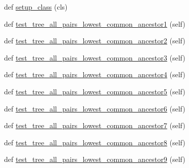 \begin{DoxyCompactItemize}
\item 
def \hyperlink{classnetworkx_1_1algorithms_1_1tests_1_1test__lowest__common__ancestors_1_1TestTreeLCA_a8c1cc9b90906daa971ae41ac3050ba1a}{setup\+\_\+class} (cls)
\item 
def \hyperlink{classnetworkx_1_1algorithms_1_1tests_1_1test__lowest__common__ancestors_1_1TestTreeLCA_aaae1063c63cb13fc127b25596dd39531}{test\+\_\+tree\+\_\+all\+\_\+pairs\+\_\+lowest\+\_\+common\+\_\+ancestor1} (self)
\item 
def \hyperlink{classnetworkx_1_1algorithms_1_1tests_1_1test__lowest__common__ancestors_1_1TestTreeLCA_ae9e7e2a583da4b6af5feb55dbdf56a5f}{test\+\_\+tree\+\_\+all\+\_\+pairs\+\_\+lowest\+\_\+common\+\_\+ancestor2} (self)
\item 
def \hyperlink{classnetworkx_1_1algorithms_1_1tests_1_1test__lowest__common__ancestors_1_1TestTreeLCA_a6f2f7cd74bc87107b18c4e16a1600ea3}{test\+\_\+tree\+\_\+all\+\_\+pairs\+\_\+lowest\+\_\+common\+\_\+ancestor3} (self)
\item 
def \hyperlink{classnetworkx_1_1algorithms_1_1tests_1_1test__lowest__common__ancestors_1_1TestTreeLCA_a3ab237dc6f8edb0c767de25cc72ed414}{test\+\_\+tree\+\_\+all\+\_\+pairs\+\_\+lowest\+\_\+common\+\_\+ancestor4} (self)
\item 
def \hyperlink{classnetworkx_1_1algorithms_1_1tests_1_1test__lowest__common__ancestors_1_1TestTreeLCA_a50175651699cc97c89d43cefbfeacd83}{test\+\_\+tree\+\_\+all\+\_\+pairs\+\_\+lowest\+\_\+common\+\_\+ancestor5} (self)
\item 
def \hyperlink{classnetworkx_1_1algorithms_1_1tests_1_1test__lowest__common__ancestors_1_1TestTreeLCA_a48a87e75fbc664f4b51a34efd2e54660}{test\+\_\+tree\+\_\+all\+\_\+pairs\+\_\+lowest\+\_\+common\+\_\+ancestor6} (self)
\item 
def \hyperlink{classnetworkx_1_1algorithms_1_1tests_1_1test__lowest__common__ancestors_1_1TestTreeLCA_a5e8cf198f66726f9cfcf6ca7955da6bd}{test\+\_\+tree\+\_\+all\+\_\+pairs\+\_\+lowest\+\_\+common\+\_\+ancestor7} (self)
\item 
def \hyperlink{classnetworkx_1_1algorithms_1_1tests_1_1test__lowest__common__ancestors_1_1TestTreeLCA_a48b8fc958e1f1bc40f045a98534c3fef}{test\+\_\+tree\+\_\+all\+\_\+pairs\+\_\+lowest\+\_\+common\+\_\+ancestor8} (self)
\item 
def \hyperlink{classnetworkx_1_1algorithms_1_1tests_1_1test__lowest__common__ancestors_1_1TestTreeLCA_a6527870bd59ab41d89401225fb197dba}{test\+\_\+tree\+\_\+all\+\_\+pairs\+\_\+lowest\+\_\+common\+\_\+ancestor9} (self)

\end{DoxyCompactItemize}
